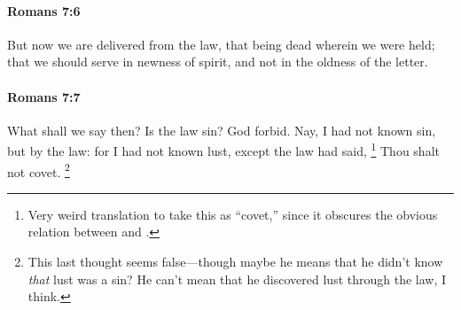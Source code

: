 		\paragraph{Romans 7:6} %
			\label{ROMANS-7-6}

			But now we are delivered from the law, that being dead wherein we were held; that we should serve in newness of spirit, and not in the oldness of the letter.

			\begin{framed}
			\scriptsize
				\begin{compactdesc}
					\item[SBLG] 
				\end{compactdesc}
			\end{framed}

		\paragraph{Romans 7:7} %
			\label{ROMANS-7-7}

			What shall we say then? Is the law sin? God forbid. Nay, I had not known sin, but by the law: for I had not known lust, except the law had said,
				\footnote{%
					Very weird translation to take this as ``covet,'' since it obscures the obvious relation between  and .
					}%
			Thou shalt not covet.%
				\footnote{%
					\label{ROMANS-7-7-known}%
					This last thought seems false---though maybe he means that he didn't know \textit{that} lust was a sin? He can't mean that he discovered lust through the law, I think.
					}

